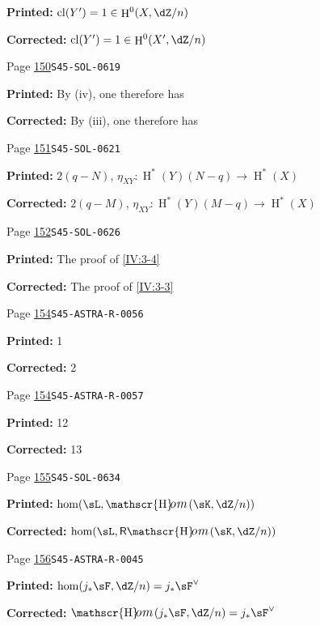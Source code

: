 \documentclass[oneside]{book}
\providecommand\calligra{\itshape}}
\DeclareMathOperator{\cl}{cl}
\DeclareMathOperator{\h}{H}
\DeclareMathOperator{\Hom}{\mathscr{H}\text{\kern -3pt {\calligra\large om}}\,} %
\DeclareMathOperator{\rHom}{\mathsf{R}\vspace{-1pt}\mathscr{H}\text{\kern -3pt {\calligra\large om}}\,}
\theoremstyle{sga-source}
\theoremstyle{sga-source-dash}
\theoremstyle{sga-source-dotdash}
\theoremstyle{sga-source-number-note-dash}
\theoremstyle{sga-source-note-number-dotdash}
\theoremstyle{sga-source-example-dotdash}
\theoremstyle{sga-source-inline-number}
\theoremstyle{sga-source-bare-number}
\theoremstyle{sga-source}
\begin{document}
\begin{description}
\par\noindent\textbf{Printed:} \(\cl(Y')=1\in \h^0(X,\dZ/n)\)
\par\noindent\textbf{Corrected:} \(\cl(Y')=1\in \h^0(X',\dZ/n)\)
\smallskip
\item[\hypertarget{apparatus:EN-0084}{84}] Page \hyperlink{printpage:en:150}{150}\quad\texttt{S45-SOL-0619}
\par\noindent\textbf{Printed:} By (iv), one therefore has
\par\noindent\textbf{Corrected:} By (iii), one therefore has
\smallskip
\item[\hypertarget{apparatus:EN-0085}{85}] Page \hyperlink{printpage:en:151}{151}\quad\texttt{S45-SOL-0621}
\par\noindent\textbf{Printed:} $2(q-N)$, $\eta_{XY}:\h^*(Y)(N-q)\to \h^*(X)$
\par\noindent\textbf{Corrected:} $2(q-M)$, $\eta_{XY}:\h^*(Y)(M-q)\to \h^*(X)$
\smallskip
\item[\hypertarget{apparatus:EN-0086}{86}] Page \hyperlink{printpage:en:152}{152}\quad\texttt{S45-SOL-0626}
\par\noindent\textbf{Printed:} The proof of \ref{IV:3-4}
\par\noindent\textbf{Corrected:} The proof of \ref{IV:3-3}
\smallskip
\item[\hypertarget{apparatus:EN-0087}{87}] Page \hyperlink{printpage:en:154}{154}\quad\texttt{S45-ASTRA-R-0056}
\par\noindent\textbf{Printed:} 1
\par\noindent\textbf{Corrected:} 2
\smallskip
\item[\hypertarget{apparatus:EN-0088}{88}] Page \hyperlink{printpage:en:154}{154}\quad\texttt{S45-ASTRA-R-0057}
\par\noindent\textbf{Printed:} 12
\par\noindent\textbf{Corrected:} 13
\smallskip
\item[\hypertarget{apparatus:EN-0089}{89}] Page \hyperlink{printpage:en:155}{155}\quad\texttt{S45-SOL-0634}
\par\noindent\textbf{Printed:} \(\hom(\sL,\Hom(\sK,\dZ/n))\)
\par\noindent\textbf{Corrected:} \(\hom(\sL,\rHom(\sK,\dZ/n))\)
\smallskip
\item[\hypertarget{apparatus:EN-0090}{90}] Page \hyperlink{printpage:en:156}{156}\quad\texttt{S45-ASTRA-R-0045}
\par\noindent\textbf{Printed:} \(\hom(j_\ast\sF,\dZ/n)=j_\ast\sF^\vee\)
\par\noindent\textbf{Corrected:} \(\Hom(j_\ast\sF,\dZ/n)=j_\ast\sF^\vee\)

\end{description}
\end{document}
